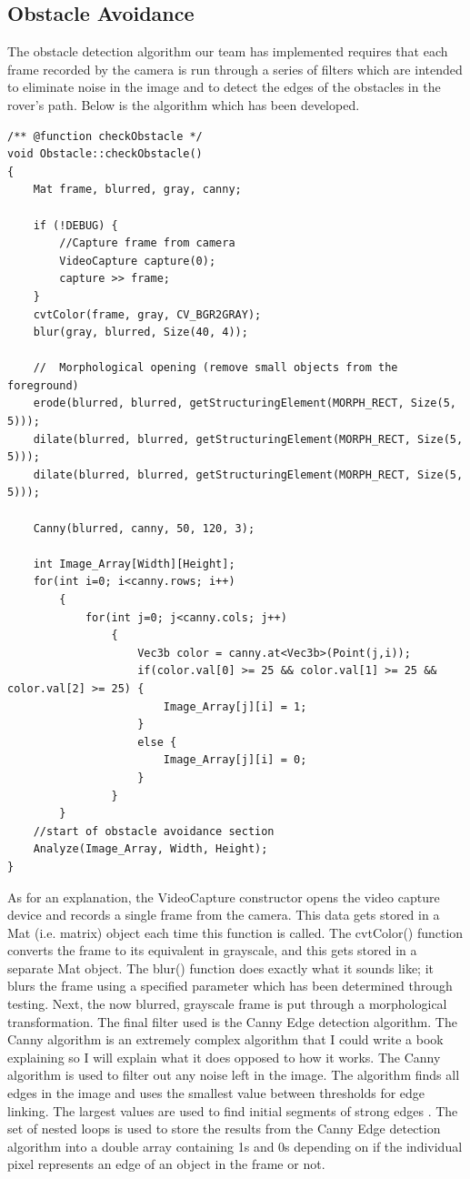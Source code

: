 \documentclass[10pt,letterpaper,onecolumn,draftclsnofoot,journal]{IEEEtran}
\begin{document}
\subsection{\textbf{Obstacle Avoidance}}
The obstacle detection algorithm our team has implemented requires that each frame recorded by the camera is run through a series of filters which are intended to eliminate noise in the image and to detect the edges of the obstacles in the rover's path. Below is the algorithm which has been developed.\vspace{.3cm}
\par
\begin{minipage}{\textwidth}
\begin{lstlisting}
/** @function checkObstacle */
void Obstacle::checkObstacle()
{
	Mat frame, blurred, gray, canny;

	if (!DEBUG) {
		//Capture frame from camera
		VideoCapture capture(0);
		capture >> frame;
	}
	cvtColor(frame, gray, CV_BGR2GRAY);
	blur(gray, blurred, Size(40, 4));

	//	Morphological opening (remove small objects from the foreground)
	erode(blurred, blurred, getStructuringElement(MORPH_RECT, Size(5, 5)));
	dilate(blurred, blurred, getStructuringElement(MORPH_RECT, Size(5, 5)));
	dilate(blurred, blurred, getStructuringElement(MORPH_RECT, Size(5, 5)));

	Canny(blurred, canny, 50, 120, 3);

	int Image_Array[Width][Height];
	for(int i=0; i<canny.rows; i++)
		{
			for(int j=0; j<canny.cols; j++)
				{
					Vec3b color = canny.at<Vec3b>(Point(j,i));
					if(color.val[0] >= 25 && color.val[1] >= 25 && color.val[2] >= 25) {
						Image_Array[j][i] = 1;
					}
					else {
						Image_Array[j][i] = 0;
					}
				}
		}
	//start of obstacle avoidance section
	Analyze(Image_Array, Width, Height);
}
\end{lstlisting}
\end{minipage}
\par
As for an explanation, the VideoCapture constructor opens the video capture device and records a single frame from the camera. This data gets stored in a Mat (i.e. matrix) object each time this function is called. The cvtColor() function converts the frame to its equivalent in grayscale, and this gets stored in a separate Mat object. The blur() function does exactly what it sounds like; it blurs the frame using a specified parameter which has been determined through testing. Next, the now blurred, grayscale frame is put through a morphological transformation. The final filter used is the Canny Edge detection algorithm. The Canny algorithm is an extremely complex algorithm that I could write a book explaining so I will explain what it does opposed to how it works. The Canny algorithm is used to filter out any noise left in the image. The algorithm finds all edges in the image and uses the smallest value between thresholds for edge linking. The largest values are used to find initial segments of strong edges \cite{opencv2}. The set of nested loops is used to store the results from the Canny Edge detection algorithm into a double array containing 1s and 0s depending on if the individual pixel represents an edge of an object in the frame or not.
\end{document}
